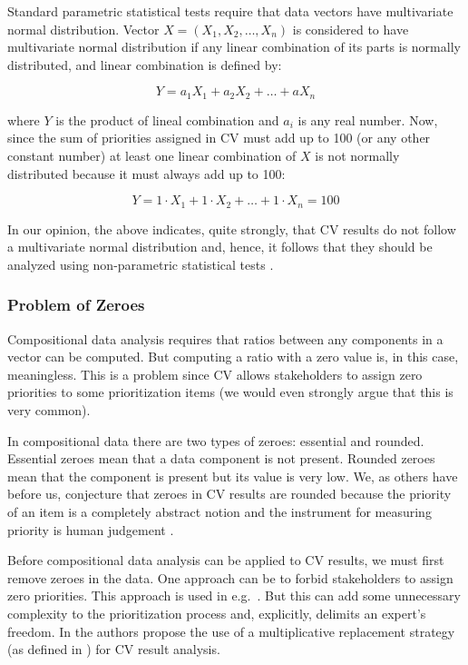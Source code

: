 Standard parametric statistical tests require that data vectors have
multivariate normal distribution. Vector $X=(X_{1}, X_{2}, \ldots, X_{n})$
is considered to have multivariate normal distribution if any linear
combination of its parts is normally distributed, and linear combination
is defined by:

\begin{equation}
	Y=a_{1}X_{1}+a_{2}X_{2}+\ldots+aX_{n}
\end{equation}

where $Y$ is the product of lineal combination and $a_{i}$ is any
real number. Now, since the sum of priorities assigned in CV must add up
to 100 (or any other constant number) at least one linear combination
of $X$ is not normally distributed because it must always add up to
100:

\begin{equation}
	Y=1\cdot X_{1}+1\cdot X_{2}+\ldots+1\cdot X_{n}=100
\end{equation}

In our opinion, the above indicates, quite strongly, that CV results do not follow a multivariate normal distribution and, hence, it follows that they should be analyzed using non-parametric statistical tests \citep{Pawlowsky-Glahn2006}.

\subsubsection{\label{Problem-of-Zeroes}Problem of Zeroes}
Compositional data analysis requires that ratios between any components in a vector can be
computed. But computing a ratio with a zero value is, in this case, meaningless. This is
a problem since CV allows stakeholders to assign zero priorities
to some prioritization items (we would even strongly argue that this is very common). 

In compositional data there are two types of zeroes: essential and rounded.
Essential zeroes mean that a data component
is not present. Rounded zeroes mean that the component is present but
its value is very low. We, as others have before us, conjecture that zeroes in CV results are 
rounded because the priority of an item is a completely abstract notion
and the instrument for measuring priority is human judgement \citep{Chatzipetrou2010}.

Before compositional data analysis can be applied to CV results, we must first remove
zeroes in the data. One approach can be to forbid stakeholders
to assign zero priorities. This approach is used in e.g.\ \citep{Pettersson2008}.
But this can add some unnecessary complexity to the prioritization
process and, explicitly, delimits an expert's freedom. 
In \citep{Chatzipetrou2010} the authors propose the use of a multiplicative 
replacement strategy (as defined in \citep{Martin-Fernandez2003}) for CV result analysis.

